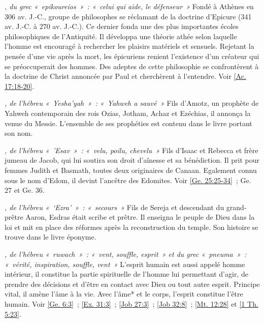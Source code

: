 \begin{multicols}{2}
\textit{, du grec «~epikoureios~»~: «~celui qui aide, le défenseur~»}\newline
Fondé à Athènes en 306 av. J.-C., groupe de philosophes se réclamant de la doctrine d'Epicure (341 av. J.-C. à 270 av. J.-C.). Ce dernier fonda une des plus importantes écoles philosophiques de l'Antiquité. Il développa une théorie athée selon laquelle l'homme est encouragé à rechercher les plaisirs matériels et sensuels. Rejetant la pensée d'une vie après la mort, les épicuriens renient l'existence d'un créateur qui se préoccuperait des hommes. Des adeptes de cette philosophie se confrontèrent à la doctrine de Christ annoncée par Paul et cherchèrent à l'entendre. Voir \vref{Ac. 17:18-20}.

\textit{, de l'hébreu «~Yesha'yah~»~: «~Yahweh a sauvé~»}\newline
Fils d'Amotz, un prophète de Yahweh contemporain des rois Ozias, Jotham, Achaz et Ezéchias, il annonça la venue du Messie. L'ensemble de ses prophéties est contenu dans le livre portant son nom.

\textit{, de l'hébreu «~'Esav~»~: «~velu, poilu, chevelu~»}\newline
Fils d'Isaac et Rebecca et frère jumeau de Jacob, qui lui soutira son droit d'aînesse et sa bénédiction. Il prit pour femmes Judith et Basmath, toutes deux originaires de Canaan. Egalement connu sous le nom d'Edom, il devint l'ancêtre des Edomites. Voir \vref{Ge. 25:25-34}~; Ge. 27 et Ge. 36.

\textit{, de l'hébreu «~`Ezra'~»~: «~secours~»}\newline
Fils de Sereja et descendant du grand-prêtre Aaron, Esdras était scribe et prêtre. Il enseigna le peuple de Dieu dans la loi et mit en place des réformes après la reconstruction du temple. Son histoire se trouve dans le livre éponyme.

\textit{, de l'hébreu «~ruwach~»~: «~vent, souffle, esprit~» et du grec «~pneuma~»~: «~vérité, inspiration, souffle, vent~»}\newline
L'esprit humain est aussi appelé homme intérieur, il constitue la partie spirituelle de l'homme lui permettant d'agir, de prendre des décisions et d'être en contact avec Dieu ou tout autre esprit. Principe vital, il amène l'âme à la vie. Avec l'âme* et le corps, l'esprit constitue l'être humain. Voir \vref{Ge. 6:3}~; \vref{Ex. 31:3}~; \vref{Job 27:3}~; \vref{Job 32:8}~; \vref{Mt. 12:28} et \vref{1 Th. 5:23}.


\end{multicols}
